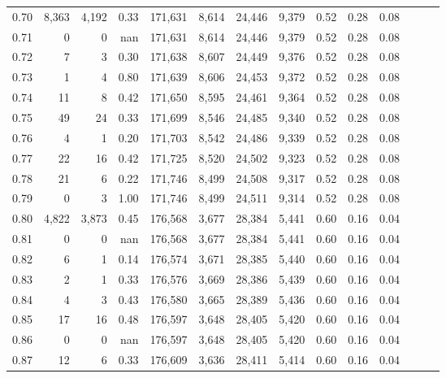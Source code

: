 \begin{tabular}{rrrrrrrrrrrrrr}
0.70 &   8,363 &  4,192 &  0.33 &  171,631 &    8,614 &  24,446 &   9,379 &  0.52 &  0.28 &      0.08 \\
0.71 &       0 &      0 &   nan &  171,631 &    8,614 &  24,446 &   9,379 &  0.52 &  0.28 &      0.08 \\
0.72 &       7 &      3 &  0.30 &  171,638 &    8,607 &  24,449 &   9,376 &  0.52 &  0.28 &      0.08 \\
0.73 &       1 &      4 &  0.80 &  171,639 &    8,606 &  24,453 &   9,372 &  0.52 &  0.28 &      0.08 \\
0.74 &      11 &      8 &  0.42 &  171,650 &    8,595 &  24,461 &   9,364 &  0.52 &  0.28 &      0.08 \\
0.75 &      49 &     24 &  0.33 &  171,699 &    8,546 &  24,485 &   9,340 &  0.52 &  0.28 &      0.08 \\
0.76 &       4 &      1 &  0.20 &  171,703 &    8,542 &  24,486 &   9,339 &  0.52 &  0.28 &      0.08 \\
0.77 &      22 &     16 &  0.42 &  171,725 &    8,520 &  24,502 &   9,323 &  0.52 &  0.28 &      0.08 \\
0.78 &      21 &      6 &  0.22 &  171,746 &    8,499 &  24,508 &   9,317 &  0.52 &  0.28 &      0.08 \\
0.79 &       0 &      3 &  1.00 &  171,746 &    8,499 &  24,511 &   9,314 &  0.52 &  0.28 &      0.08 \\
0.80 &   4,822 &  3,873 &  0.45 &  176,568 &    3,677 &  28,384 &   5,441 &  0.60 &  0.16 &      0.04 \\
0.81 &       0 &      0 &   nan &  176,568 &    3,677 &  28,384 &   5,441 &  0.60 &  0.16 &      0.04 \\
0.82 &       6 &      1 &  0.14 &  176,574 &    3,671 &  28,385 &   5,440 &  0.60 &  0.16 &      0.04 \\
0.83 &       2 &      1 &  0.33 &  176,576 &    3,669 &  28,386 &   5,439 &  0.60 &  0.16 &      0.04 \\
0.84 &       4 &      3 &  0.43 &  176,580 &    3,665 &  28,389 &   5,436 &  0.60 &  0.16 &      0.04 \\
0.85 &      17 &     16 &  0.48 &  176,597 &    3,648 &  28,405 &   5,420 &  0.60 &  0.16 &      0.04 \\
0.86 &       0 &      0 &   nan &  176,597 &    3,648 &  28,405 &   5,420 &  0.60 &  0.16 &      0.04 \\
0.87 &      12 &      6 &  0.33 &  176,609 &    3,636 &  28,411 &   5,414 &  0.60 &  0.16 &      0.04 \\

\end{tabular}
